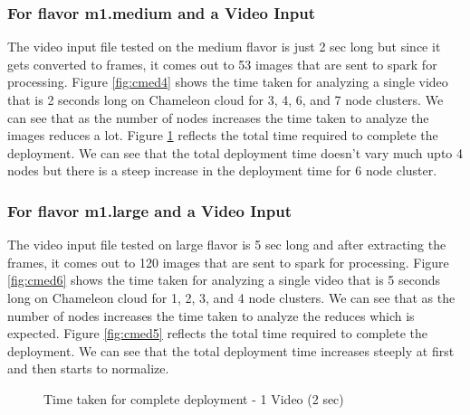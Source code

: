 \documentclass[9pt,twocolumn,twoside]{../../styles/osajnl}
\begin{document}
\subsubsection{For flavor m1.medium and a Video Input }
The video input file tested on the medium flavor is just 2 sec long
but since it gets converted to frames, it comes out to 53 images that
are sent to spark for processing.  Figure \ref{fig:cmed4} shows the
time taken for analyzing a single video that is 2 seconds long on
Chameleon cloud for 3, 4, 6, and 7 node clusters. We can see that as
the number of nodes increases the time taken to analyze the images
reduces a lot. Figure \ref{fig:cmed3} reflects the total time required
to complete the deployment. We can see that the total deployment time
doesn't vary much upto 4 nodes but there is a steep increase in the
deployment time for 6 node cluster.

\subsubsection{For flavor m1.large and a Video Input }
The video input file tested on large flavor is 5 sec long and after
extracting the frames, it comes out to 120 images that are sent to
spark for processing.
Figure \ref{fig:cmed6} shows the time taken for analyzing a single
video that is 5 seconds long on Chameleon cloud for 1, 2, 3, and 4
node clusters. We can see that as the number of nodes increases the
time taken to analyze the reduces which is expected. Figure
\ref{fig:cmed5} reflects the total time required to complete the
deployment. We can see that the total deployment time increases
steeply at first and then starts to normalize.

\begin{figure}[htbp]
\centering
{}
\caption{Time taken for complete deployment - 1 Video (2 sec)}
\label{fig:cmed3}
\end{figure}
\end{document}
